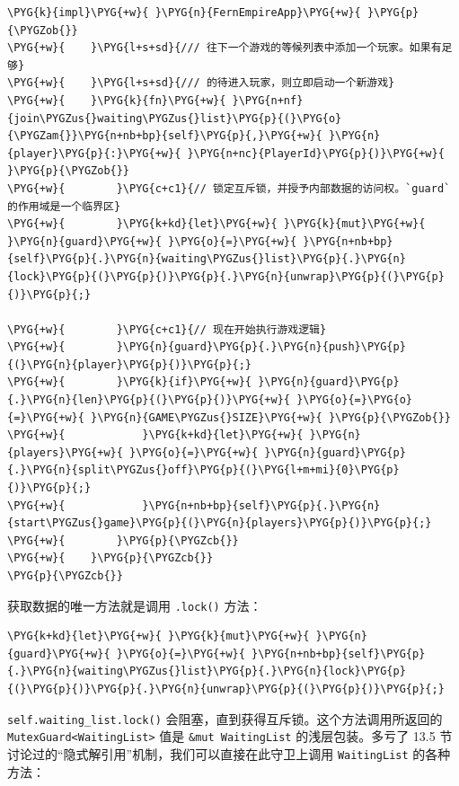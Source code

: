 \begin{Verbatim}[commandchars=\\\{\},breaklines=true,breakanywhere=true,fontsize=\codefont,xleftmargin=17bp]
\PYG{k}{impl}\PYG{+w}{ }\PYG{n}{FernEmpireApp}\PYG{+w}{ }\PYG{p}{\PYGZob{}}
\PYG{+w}{    }\PYG{l+s+sd}{/// 往下一个游戏的等候列表中添加一个玩家。如果有足够}
\PYG{+w}{    }\PYG{l+s+sd}{/// 的待进入玩家，则立即启动一个新游戏}
\PYG{+w}{    }\PYG{k}{fn}\PYG{+w}{ }\PYG{n+nf}{join\PYGZus{}waiting\PYGZus{}list}\PYG{p}{(}\PYG{o}{\PYGZam{}}\PYG{n+nb+bp}{self}\PYG{p}{,}\PYG{+w}{ }\PYG{n}{player}\PYG{p}{:}\PYG{+w}{ }\PYG{n+nc}{PlayerId}\PYG{p}{)}\PYG{+w}{ }\PYG{p}{\PYGZob{}}
\PYG{+w}{        }\PYG{c+c1}{// 锁定互斥锁，并授予内部数据的访问权。`guard`的作用域是一个临界区}
\PYG{+w}{        }\PYG{k+kd}{let}\PYG{+w}{ }\PYG{k}{mut}\PYG{+w}{ }\PYG{n}{guard}\PYG{+w}{ }\PYG{o}{=}\PYG{+w}{ }\PYG{n+nb+bp}{self}\PYG{p}{.}\PYG{n}{waiting\PYGZus{}list}\PYG{p}{.}\PYG{n}{lock}\PYG{p}{(}\PYG{p}{)}\PYG{p}{.}\PYG{n}{unwrap}\PYG{p}{(}\PYG{p}{)}\PYG{p}{;}

\PYG{+w}{        }\PYG{c+c1}{// 现在开始执行游戏逻辑}
\PYG{+w}{        }\PYG{n}{guard}\PYG{p}{.}\PYG{n}{push}\PYG{p}{(}\PYG{n}{player}\PYG{p}{)}\PYG{p}{;}
\PYG{+w}{        }\PYG{k}{if}\PYG{+w}{ }\PYG{n}{guard}\PYG{p}{.}\PYG{n}{len}\PYG{p}{(}\PYG{p}{)}\PYG{+w}{ }\PYG{o}{=}\PYG{o}{=}\PYG{+w}{ }\PYG{n}{GAME\PYGZus{}SIZE}\PYG{+w}{ }\PYG{p}{\PYGZob{}}
\PYG{+w}{            }\PYG{k+kd}{let}\PYG{+w}{ }\PYG{n}{players}\PYG{+w}{ }\PYG{o}{=}\PYG{+w}{ }\PYG{n}{guard}\PYG{p}{.}\PYG{n}{split\PYGZus{}off}\PYG{p}{(}\PYG{l+m+mi}{0}\PYG{p}{)}\PYG{p}{;}
\PYG{+w}{            }\PYG{n+nb+bp}{self}\PYG{p}{.}\PYG{n}{start\PYGZus{}game}\PYG{p}{(}\PYG{n}{players}\PYG{p}{)}\PYG{p}{;}
\PYG{+w}{        }\PYG{p}{\PYGZcb{}}
\PYG{+w}{    }\PYG{p}{\PYGZcb{}}
\PYG{p}{\PYGZcb{}}
\end{Verbatim}

获取数据的唯一方法就是调用 \texttt{.lock()} 方法：

\begin{Verbatim}[commandchars=\\\{\},breaklines=true,breakanywhere=true,fontsize=\codefont,xleftmargin=17bp]
\PYG{k+kd}{let}\PYG{+w}{ }\PYG{k}{mut}\PYG{+w}{ }\PYG{n}{guard}\PYG{+w}{ }\PYG{o}{=}\PYG{+w}{ }\PYG{n+nb+bp}{self}\PYG{p}{.}\PYG{n}{waiting\PYGZus{}list}\PYG{p}{.}\PYG{n}{lock}\PYG{p}{(}\PYG{p}{)}\PYG{p}{.}\PYG{n}{unwrap}\PYG{p}{(}\PYG{p}{)}\PYG{p}{;}
\end{Verbatim}

\texttt{self.waiting\_list.lock()} 会阻塞，直到获得互斥锁。这个方法调用所返回的 \texttt{MutexGuard<WaitingList>} 值是 \texttt{\&mut WaitingList} 的浅层包装。多亏了 13.5 节讨论过的“隐式解引用”机制，我们可以直接在此守卫上调用 \texttt{WaitingList} 的各种方法：

